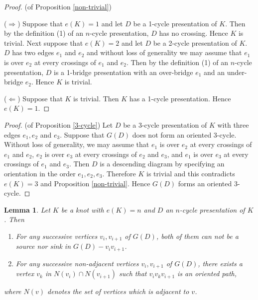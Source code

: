 \documentclass{amsart}
\newtheorem{lemma}[theorem]{Lemma}
\theoremstyle{definition}
\theoremstyle{remark}
\numberwithin{equation}{section}
\begin{document}
\begin{proof}(of Proposition \ref{non-trivial})

($\Rightarrow$) Suppose that $e(K)=1$ and let $D$ be a 1-cycle presentation of $K$.
Then by the definition (1) of an $n$-cycle presentation, $D$ has no crossing.
Hence $K$ is trivial.
Next suppose that $e(K)=2$ and let $D$ be a 2-cycle presentation of $K$.
$D$ has two edges $e_1$ and $e_2$ and without loss of generality we may assume that $e_1$ is over $e_2$ at every crossings of $e_1$ and $e_2$.
Then by the definition (1) of an $n$-cycle presentation, $D$ is a 1-bridge presentation with an over-bridge $e_1$ and an under-bridge $e_2$.
Hence $K$ is trivial.

($\Leftarrow$) Suppose that $K$ is trivial.
Then $K$ has a 1-cycle presentation.
Hence $e(K)=1$.
\end{proof}

\begin{proof}(of Proposition \ref{3-cycle})
Let $D$ be a 3-cycle presentation of $K$ with three edges $e_1, e_2$ and $e_3$.
Suppose that $G(D)$ does not form an oriented 3-cycle.
Without loss of generality, we may assume that $e_1$ is over $e_2$ at every crossings of $e_1$ and $e_2$, $e_2$ is over $e_3$ at every crossings of $e_2$ and $e_3$, and $e_1$ is over $e_3$ at every crossings of $e_1$ and $e_3$.
Then $D$ is a descending diagram by specifying an orientation in the order $e_1,e_2,e_3$.
Therefore $K$ is trivial and this contradicts $e(K)=3$ and Proposition \ref{non-trivial}.
Hence $G(D)$ forms an oriented 3-cycle.
\end{proof}

\begin{lemma}\label{neighbourhood}
Let $K$ be a knot with $e(K)=n$ and $D$ an $n$-cycle presentation of $K$.
Then 
\begin{enumerate}
\item For any successive vertices $v_i, v_{i+1}$ of $G(D)$, both of them can not be a source nor sink in $G(D)-v_iv_{i+1}$.
\item For any successive non-adjacent vertices $v_i, v_{i+1}$ of $G(D)$, there exists a vertex $v_k$ in $N(v_i)\cap N(v_{i+1})$ such that $v_iv_kv_{i+1}$ is an oriented path,
\end{enumerate}
where $N(v)$ denotes the set of vertices which is adjacent to $v$.
\end{lemma}
\end{document}
